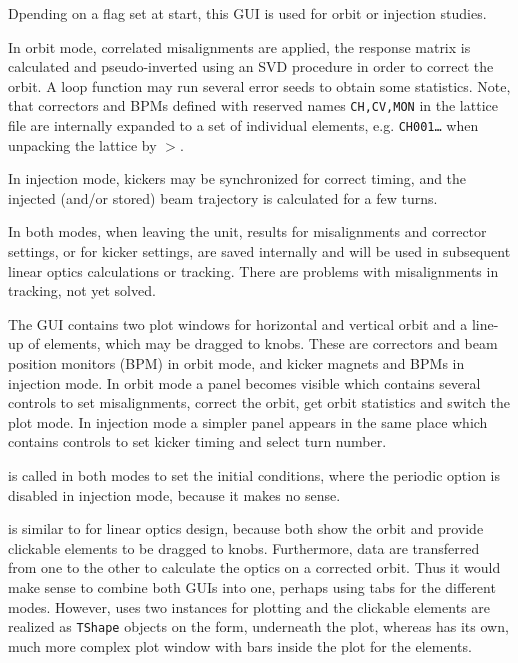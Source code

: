 \documentclass[12pt]{article}
\newcommand\code[1]{{\tt #1}}
\newcommand{\unico}[1]{{\color{burntorange}\code{#1}}}
\newcommand{\prcod}[2]{\opauni{#1}$>$\unico{#2}}
\newcommand{\opagui}[1]{\colorbox{blue!20}{{\color{black}\code{#1}}}}
\newcommand{\ogui}[1]{\hyperref[#1]{\opagui{#1}}}
\newcommand{\opaguif}[1]{\colorbox{violet!30}{{\color{black}\code{#1}}}}
\newcommand{\oguif}[1]{\hyperref[#1]{\opaguif{#1}}}
\newcommand{\opauni}[1]{\colorbox{orange!30}{{\color{black}\code{#1}}}}
\newcommand{\desc}[1]{#1}
\newcommand{\todo}[1]{{\color{red} #1}}
\begin{document}
\desc{Dpending on a flag set at start, this GUI is used for orbit or injection studies. 

In orbit mode, correlated misalignments are applied, the response matrix is calculated and pseudo-inverted using an SVD procedure in order to correct the orbit. A loop function may run several error seeds to obtain some statistics. Note, that correctors and BPMs defined with reserved names \code{CH,CV,MON} in the lattice file are internally expanded to a set of individual elements, e.g. \code{CH001\dots} when unpacking the lattice by \prcod{globlib}{MakeLattice}.

In injection mode, kickers may be synchronized for correct timing, and the injected (and/or stored) beam trajectory is calculated for a few turns.

In both modes, when leaving the unit, results for misalignments and corrector settings, or for kicker settings, are saved internally and will be used in subsequent linear optics calculations or tracking. \todo{There are problems with misalignments in tracking, not yet solved.}

The GUI contains two plot windows for horizontal and vertical orbit and a line-up of elements, which may be dragged to knobs. These are correctors and beam position monitors (BPM) in orbit mode, and kicker magnets and BPMs in injection mode. In orbit mode a panel becomes visible which contains several controls to set misalignments, correct the orbit, get orbit statistics and switch the plot mode. In injection mode a simpler panel appears in the same place which contains controls to set kicker timing and select turn number.

\ogui{ostartmenu} is called in both modes to set the initial conditions, where the periodic option is disabled in injection mode, because it makes no sense.

\todo{\ogui{opaorbit} is similar to \ogui{opalinop} for linear optics design, because both show the orbit and provide clickable elements to be dragged to knobs. Furthermore, data are transferred from one to the other to calculate the optics on a corrected orbit. Thus it would make sense to combine both GUIs into one, perhaps using tabs for the different modes. However, \ogui{opaorbit} uses two \oguif{../com/asfigure} instances for plotting and the clickable elements are realized as \code{TShape} objects on the form, underneath the plot, whereas \ogui{opalinop} has its own, much more complex plot window with bars inside the plot for the elements.}
}
\end{document}

